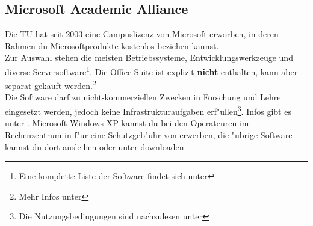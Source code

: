 \subsection{Microsoft Academic Alliance}

Die TU hat seit 2003 eine
Campuslizenz
von Microsoft erworben, in deren Rahmen du Microsoftprodukte kostenlos
beziehen kannst.\\
Zur Auswahl stehen die meisten Betriebssysteme, Entwicklungswerkzeuge und
diverse Serversoftware\footnote{\sloppy Eine komplette Liste der Software
findet sich unter }.
Die Office-Suite ist explizit \textbf{nicht} enthalten, kann aber separat
gekauft werden.\footnote{Mehr Infos unter
}\\
Die Software darf zu nicht-kommerziellen Zwecken in Forschung und Lehre
eingesetzt werden, jedoch keine Infrastrukturaufgaben
erf"ullen\footnote{Die Nutzungsbedingungen sind nachzulesen unter
}.
Infos gibt es unter
.
Microsoft Windows XP kannst du bei den Operateuren im Rechenzentrum in
f"ur eine Schutzgeb"uhr von  erwerben, die "ubrige Software kannst du
dort ausleihen oder unter
downloaden.